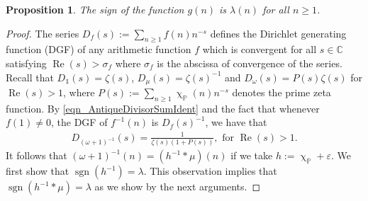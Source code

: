 \documentclass[11pt,reqno,a4letter]{article}
\numberwithin{equation}{section}
\numberwithin{figure}{section}
\numberwithin{table}{section}
\renewcommand{\chi}{\upchi}
\theoremstyle{plain}
\newtheorem{prop}[theorem]{Proposition}
\numberwithin{theorem}{section}
\theoremstyle{definition}
\renewcommand{\Re}{\operatorname{Re}}
\begin{document}
\begin{prop}
\label{prop_SignageDirInvsOfPosBddArithmeticFuncs_v1} 
The sign of the function $g(n)$ is $\lambda(n)$ for all $n \geq 1$. 
\end{prop} 
\begin{proof} 
The series $D_f(s) := \sum_{n \geq 1} f(n) n^{-s}$ defines the 
Dirichlet generating function (DGF) of any 
arithmetic function $f$ which is convergent for all $s \in \mathbb{C}$ satisfying 
$\Re(s) > \sigma_f$ where $\sigma_f$ is the abscissa of convergence of the series. 
Recall that $D_{\mathds{1}}(s) = \zeta(s)$, $D_{\mu}(s) = \zeta(s)^{-1}$ and 
$D_{\omega}(s) = P(s) \zeta(s)$ for $\Re(s) > 1$, where $P(s) := \sum_{n \geq 1} \chi_{\mathbb{P}}(n) n^{-s}$ 
denotes the prime zeta function. 
By \eqref{eqn_AntiqueDivisorSumIdent} and the fact that whenever $f(1) \neq 0$, 
the DGF of $f^{-1}(n)$ is $D_f(s)^{-1}$, we have that 
\begin{align} 
\label{eqn_DGF_of_gInvn} 
D_{(\omega+1)^{-1}}(s) = \frac{1}{\zeta(s) (1+P(s))}, \text{ for } \Re(s) > 1. 
\end{align} 
It follows that $(\omega + 1)^{-1}(n) = (h^{-1} \ast \mu)(n)$ if we take 
$h := \chi_{\mathbb{P}} + \varepsilon$. 
We first show that $\operatorname{sgn}(h^{-1}) = \lambda$. 
This observation implies that 
$\operatorname{sgn}(h^{-1} \ast \mu) = \lambda$ as we show by the next arguments. 


\end{proof}
\end{document}
